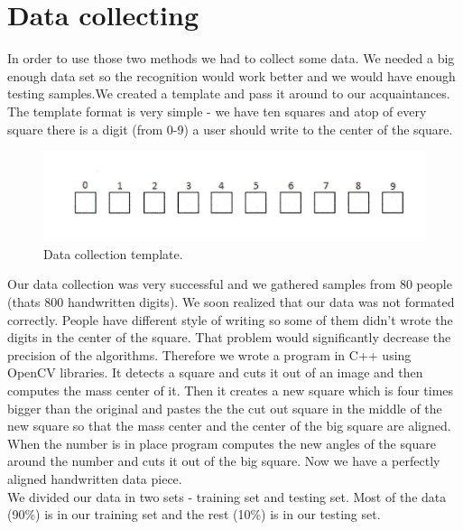 \documentclass[12pt]{article}
\begin{document}
\section{Data collecting}
In order to use those two methods we had to collect some data. We needed a big enough data set so the recognition would work better and we would have enough testing samples.We created a template and pass it around to our acquaintances. The template format is very simple - we have ten squares and atop of every square there is a digit (from 0-9) a user should write to the center of the square.
\begin{figure}[h]
	\centering
	\includegraphics[clip,scale=0.62]{images/empty_temp.png}
	\caption[Data collection template]{Data collection template.}
	
\end{figure}
\newline
Our data collection was very successful and we gathered samples from 80 people (thats 800 handwritten digits). We soon realized that our data was not formated correctly. People have different style of writing so some of them didn't wrote the digits in the center of the square. That problem would significantly decrease the precision of the algorithms. Therefore we wrote a program in C++ using OpenCV libraries. It detects a square and cuts it out of an image and then computes the mass center of it. Then it creates a new square which is four times bigger than the original and pastes the the cut out square in the middle of the new square so that the mass center and the center of the big square are aligned. When the number is in place program computes the new angles of the square around the number and cuts it out of the big square. Now we have a perfectly aligned handwritten data piece.\\
\newline
We divided our data in two sets - training set and testing set. Most of the data (90\%) is in our training set and the rest (10\%) is in our testing set.\\
\end{document}
